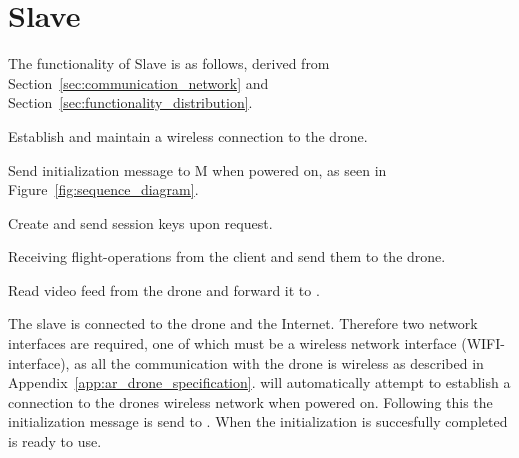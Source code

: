 \section{Slave}
\label{sec:design_slave}
The functionality of Slave is as follows, derived from Section~\ref{sec:communication_network} and Section~\ref{sec:functionality_distribution}.

\begin{enumarate}
	\item Establish and maintain a wireless connection to the drone.
	\item Send initialization message to M when powered on, as seen in Figure~\ref{fig:sequence_diagram}.
	\item Create and send session keys upon request.
	\item Receiving flight-operations from the client and send them to the drone.
	\item Read video feed from the drone and forward it to .
\end{enumarate}

The slave is connected to the drone and the Internet.
Therefore two network interfaces are required, one of which must be a wireless network interface (WIFI-interface), as all the communication with the drone is wireless as described in Appendix~\ref{app:ar_drone_specification}.
 will automatically attempt to establish a connection to the drones wireless network when powered on.
Following this the initialization message is send to .
When the initialization is succesfully completed  is ready to use. \\







